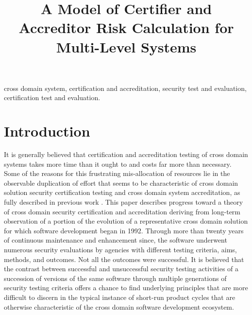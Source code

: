 \documentclass[10pt,letterpaper,conference]{IEEEtran}
\begin{document}
\title{A Model of Certifier and Accreditor Risk Calculation for Multi-Level Systems}

\author{
}

\maketitle

\begin{abstract}
	
\end{abstract}

\def\IEEEkeywordsname{Index Terms}


\begin{IEEEkeywords}
	cross domain system, certification and accreditation,
	security test and evaluation, certification test and evaluation.
\end{IEEEkeywords}

\IEEEpeerreviewmaketitle

\section{Introduction}

It is generally believed that
certification and accreditation testing of cross domain systems takes more time than it ought
to and costs far more than necessary. Some of the reasons for this frustrating mis-allocation
of resources lie in the observable duplication of effort that seems to be characteristic of
cross domain solution security certification testing and cross domain system accreditation, as
fully described in previous work \cite{Loughry2010a,Loughry2012a}. This paper describes progress
toward a theory of cross domain security certification and accreditation deriving from long-term
observation of a portion of the evolution of a representative cross domain solution for which
software development began in 1992. Through more than twenty years of continuous maintenance and
enhancement since, the software underwent numerous security evaluations by agencies with different
testing criteria, aims, methods, and outcomes. Not all the outcomes were successful. It is
believed that the contrast between successful and unsuccessful security testing activities of a
succession of versions of the same software through multiple generations of security testing
criteria offers a chance to find underlying principles that are more difficult to discern in the
typical instance of short-run product cycles that are otherwise characteristic of the cross
domain software development ecosystem.
\end{document}
